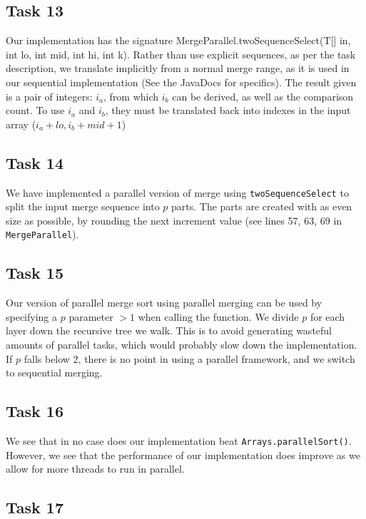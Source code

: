 \documentclass[11pt, a4paper]{article}
\begin{document}
\subsection{Task 13}

Our implementation has the signature MergeParallel.twoSequenceSelect(T[] in, int lo, int mid, int hi, int k).
Rather than use explicit sequences, as per the task description, we translate implicitly from a normal merge range, as it is used in our sequential implementation (See the JavaDocs for specifics).
The result given is a pair of integers: $i_a$, from which $i_b$ can be derived, as well as the comparison count. To use $i_a$ and $i_b$, they must be translated back into indexes in the input array ($i_a+lo, i_b+mid+1$)

\subsection{Task 14}

We have implemented a parallel version of merge using \texttt{twoSequenceSelect} to split the input merge sequence into $p$ parts.
The parts are created with as even size as possible, by rounding the next increment value (see lines 57, 63, 69 in \texttt{MergeParallel}).


\subsection{Task 15}

Our version of parallel merge sort using parallel merging can be used by specifying a $p$ parameter $> 1$ when calling the function.
We divide $p$ for each layer down the recursive tree we walk. This is to avoid generating wasteful amounts of parallel tasks, which would probably slow down the implementation.
If $p$ falls below 2, there is no point in using a parallel framework, and we switch to sequential merging.

\subsection{Task 16}

We see that in no case does our implementation beat \texttt{Arrays.parallelSort()}. However, we see that the performance of our implementation does improve as we allow for more threads to run in parallel.

\subsection{Task 17}
\end{document}
